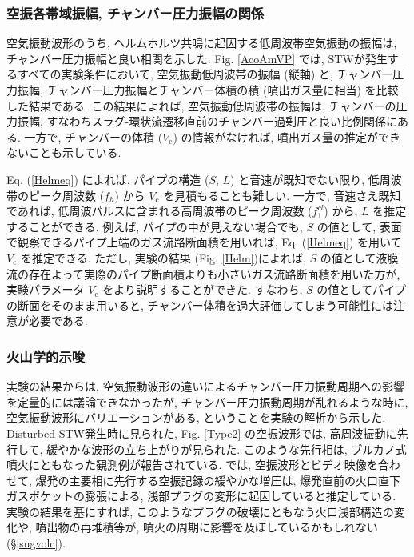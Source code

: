 \documentclass[12pt]{article}
\begin{document}

\subsubsection{空振各帯域振幅, チャンバー圧力振幅の関係}


空気振動波形のうち, ヘルムホルツ共鳴に起因する低周波帯空気振動の振幅は, チャンバー圧力振幅と良い相関を示した. Fig. \ref{AcoAmVP} では, STWが発生するすべての実験条件において, 空気振動低周波帯の振幅 (縦軸) と, チャンバー圧力振幅, チャンバー圧力振幅とチャンバー体積の積 (噴出ガス量に相当) を比較した結果である. この結果によれば, 空気振動低周波帯の振幅は, チャンバーの圧力振幅, すなわちスラグ-環状流遷移直前のチャンバー過剰圧と良い比例関係にある. 一方で, チャンバーの体積 ($V_\mathrm{c}$) の情報がなければ, 噴出ガス量の推定ができないことも示している. 

Eq. (\ref{Helmeq}) によれば, パイプの構造 ($S$, $L$) と音速が既知でない限り, 低周波帯のピーク周波数  ($f_{h}$)  から $V_\mathrm{c}$ を見積もることも難しい. 一方で, 音速さえ既知であれば, 低周波パルスに含まれる高周波帯のピーク周波数 ($f^{cl}_{1}$) から, $L$ を推定することができる. 例えば, パイプの中が見えない場合でも, $S$ の値として, 表面で観察できるパイプ上端のガス流路断面積を用いれば, Eq. (\ref{Helmeq}) を用いて $V_\mathrm{c}$ を推定できる. 
ただし, 実験の結果 (Fig. \ref{Helm})によれば, $S$ の値として液膜流の存在よって実際のパイプ断面積よりも小さいガス流路断面積を用いた方が, 実験パラメータ $V_\mathrm{c}$ をより説明することができた. すなわち, $S$ の値としてパイプの断面をそのまま用いると, チャンバー体積を過大評価してしまう可能性には注意が必要である.


\clearpage
\subsubsection{火山学的示唆}\label{acoshisa}
実験の結果からは, 空気振動波形の違いによるチャンバー圧力振動周期への影響を定量的には議論できなかったが, チャンバー圧力振動周期が乱れるような時に, 空気振動波形にバリエーションがある, ということを実験の解析から示した.
Disturbed STW発生時に見られた, Fig. \ref{Type2} の空振波形では, 高周波振動に先行して, 緩やかな波形の立ち上がりが見られた. このような先行相は, ブルカノ式噴火にともなった観測例が報告されている. \cite{Yokoo2009}では, 空振波形とビデオ映像を合わせて, 爆発の主要相に先行する空振記録の緩やかな増圧は, 爆発直前の火口直下ガスポケットの膨張による, 浅部プラグの変形に起因していると推定している. 実験の結果を基にすれば, このようなプラグの破壊にともなう火口浅部構造の変化や, 噴出物の再堆積等が, 噴火の周期に影響を及ぼしているかもしれない (\S \ref{sugvolc}). 
\end{document}
